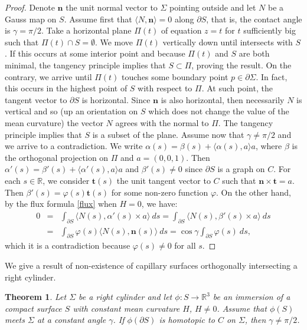 \documentclass[12pt,a4paper]{amsart}
\newtheorem{theorem}{Theorem}
\begin{document}
\begin{proof} Denote $\textbf{n}$ the unit normal vector to $\Sigma$ pointing outside and let $N$ be a Gauss map on $S$. Assume first that $\langle N,\textbf{n}\rangle=0$ along $\partial S$, that is, the contact angle is $\gamma=\pi/2$. Take a horizontal plane $\Pi(t)$ of equation $z=t$ for $t$ sufficiently big such that $\Pi(t)\cap S=\emptyset$. We move $\Pi(t)$ vertically down until intersects with $S$. If this occurs at some interior point and because $\Pi(t)$ and $S$ are both minimal, the tangency principle implies that $S\subset \Pi$, proving the result. On the contrary, we arrive until $\Pi(t)$ touches some boundary point $p\in\partial \Sigma$. In fact, this occurs in the highest point of $S$ with respect to $\Pi$. At such point, the tangent vector to $\partial S$ is horizontal. Since $\textbf{n}$ is also horizontal, then necessarily $N$ is vertical and so (up an orientation on $S$ which does not change the value of the mean curvature) the vector $N$ agrees with the normal to $\Pi$. The tangency principle implies that $S$ is a subset of the plane.
Assume now that $\gamma\not=\pi/2$ and we arrive to a contradiction. We write
$\alpha(s)=\beta(s)+\langle\alpha(s),a\rangle a$, where $\beta$ is the orthogonal projection on $\Pi$ and $a=(0,0,1)$. Then
$\alpha'(s)=\beta'(s)+\langle\alpha'(s),a\rangle a$ and $\beta'(s)\not=0$ since $\partial S$ is a graph on $C$. For each $s\in{\mathbb R}$, we consider $\textbf{t}(s)$ the unit tangent vector to $C$ such that $\textbf{n}\times\textbf{t}=a$. Then $\beta'(s)=\varphi(s)\textbf{t}(s)$ for some non-zero function $\varphi$.
On the other hand, by the flux formula \ref{flux} when $H=0$, we have:
\begin{eqnarray}\label{flux2}
0&=&\int_{\partial S}\langle N(s),\alpha'(s)\times a\rangle\ ds=\int_{\partial S}\langle N(s),\beta'(s)\times a\rangle\ ds\nonumber\\
&=&\int_{\partial S}\varphi(s)\langle N(s),\textbf{n}(s)\rangle\ ds =\cos\gamma\int_{\partial S}\varphi(s)\ ds,
\end{eqnarray}
which it is a contradiction because $\varphi(s)\not=0$ for all $s$.
\end{proof}
We give a result of non-existence of capillary surfaces orthogonally intersecting a right cylinder.
\begin{theorem} Let $\Sigma$ be a right cylinder and let $\phi:S\rightarrow{\mathbb R}^3$ be an immersion of a compact surface $S$ with constant mean curvature $H$, $H\not=0$. Assume that $\phi(S)$ meets $\Sigma$ at a constant angle $\gamma$. If $\phi(\partial S)$ is homotopic to $C$ on $\Sigma$, then $\gamma\not=\pi/2$.
\end{theorem}
\end{document}
